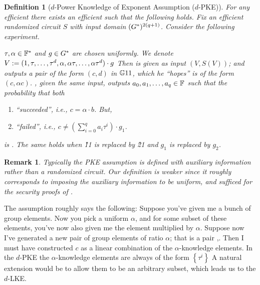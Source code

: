 \documentclass[11pt]{article}
\numberwithin{figure}{section} %
\newtheorem{dfn}[thm]{Definition}
\newtheorem{remark}[thm]{Remark}
\newcommand{\set}[1]{\ensuremath{\left\{#1\right\}}\xspace}
\begin{document}
\begin{dfn}[$d$-Power Knowledge of Exponent Assumption ($d$-PKE)]\label{dfn:koeassumption}
For any efficient \adv there exists an efficient \ext such that the following holds.
Fix an efficient  randomized circuit $S$ with input domain $(G^*)^{2(q+1)}$.
 Consider the following experiment.

 $\tau,\alpha\in \mathbb F^*$ and $g\in G^*$ are chosen uniformly. We denote $V:= (1,\tau,\ldots,\tau^{d},\alpha,\alpha \tau,\ldots,\alpha \tau^{d})\cdot g$
 Then \adv is given as input $(V,S( V))$;
 and outputs a pair of the form $(c,d)$ in ${\mathbb G}11$, which he ``hopes'' is of the form $(c,\alpha c)$.
   \ext, given the same input, outputs  
 $a_0,a_1,\ldots,a_q \in \mathbb F$ such that the probability that both
   
 \begin{enumerate}
  \item \adv ``succeeded'', i.e., $c=\alpha\cdot b$. But,
  \item \ext ``failed'', i.e., $c \neq (\sum_{i=0}^q a_i \tau^i)\cdot g_1$.
   \end{enumerate}
is \neg.
 The same holds when \G11 is replaced by \G21 and $g_1$ is replaced by $g_2$.
\end{dfn}
\begin{remark}
Typically the PKE assumption is defined with auxiliary information rather than a randomized circuit.
Our definition is weaker since it roughly corresponds to imposing the auxiliary information to be uniform,
and sufficed for the security proofs of \cite{GGPR,PHGR}.
\end{remark}
The assumption roughly says the following: Suppose you've given me a bunch of group elements. Now you pick a uniform $\alpha$, and for some subset of these 
elements, you've now also given me the element multiplied by $\alpha$. Suppose now I've generated a new pair of group elements of ratio $\alpha$; that is a pair
,. Then I must have constructed $c$ as a linear combination of the $\alpha$-knowledge elements.
In the $d$-PKE the $\alpha$-knowledge elements are always of the form \set{\tau^i}
A natural extension would be to allow them to be an arbitrary subset, which leads us to the $d$-LKE.
\end{document}
